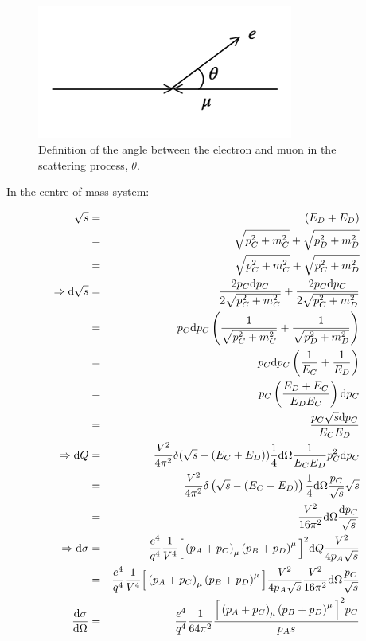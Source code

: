 \begin{figure}[!htb]
  \begin{center}
    \includegraphics[width=0.75\textwidth]{images/web_feynman/image_21.png}
    \caption[Angle between $e$ and $\mu$ in $e-\mu$ scattering]{Definition of the angle between the electron and muon in the scattering process, $\theta$.}
    \label{fig:ch7_EMuToEMuScatterAngle}
  \end{center}
\end{figure}

In the centre of mass system:

\begin{eqnarray*}
  \sqrt{s} & = & \left(E_D + E_D\right) \\
  & = & \sqrt{p_C^2 + m_C^2} + \sqrt{p_D^2 + m_D^2} \\
  & = & \sqrt{p_C^2 + m_C^2} + \sqrt{p_C^2 + m_D^2} \\
  \Rightarrow \mathrm{d}\sqrt{s} & = & \frac{2p_C\mathrm{d}p_C}{2\sqrt{p_C^2 + m_C^2}} + \frac{2p_C\mathrm{d}p_C}{2\sqrt{p_C^2 + m_D^2}} \\
  & = & p_C \mathrm{d}p_C\left(\frac{1}{\sqrt{p_C^2 + m_C^2}} + \frac{1}{\sqrt{p_D^2 + m_D^2}}\right) \\
  & = & p_C\mathrm{d}p_C\left(\frac{1}{E_C} + \frac{1}{E_D}\right) \\
  & = & p_C\left(\frac{E_D + E_C}{E_DE_C}\right)\mathrm{d}p_C \\
  & = & \frac{p_C\sqrt{s}\mathrm{d}p_C}{E_CE_D} \\
  \Rightarrow \mathrm{d}Q & = & \frac{V^2}{4\pi^2}\delta(\sqrt{s}-\left(E_C + E_D\right))\frac{1}{4}\mathrm{d}\Omega\frac{1}{E_CE_D}p_C^2\mathrm{d}p_C \\
  & = & \frac{V^2}{4\pi^2}\delta\left(\sqrt{s}-\left(E_C+E_D\right)\right)\frac{1}{4}\mathrm{d}\Omega\frac{p_C}{\sqrt{s}}\sqrt{s} \\
  & = & \frac{V^2}{16\pi^2}\mathrm{d}\Omega\frac{\mathrm{d}p_C}{\sqrt{s}} \\
  \Rightarrow \mathrm{d}\sigma & = & \frac{e^4}{q^4}\frac{1}{V^4}\Big[\left(p_A + p_C\right)_{\mu}\left(p_B + p_D\right)^{\mu}\Big]^2\mathrm{d}Q\frac{V^2}{4p_A\sqrt{s}} \\
  & = & \frac{e^4}{q^4}\frac{1}{V^4}\Big[\left(p_A + p_C\right)_{\mu}\left(p_B + p_D\right)^{\mu}\Big]\frac{V^2}{4p_A\sqrt{s}}\frac{V^2}{16\pi^2}\mathrm{d}\Omega\frac{p_C}{\sqrt{s}} \\
  \frac{\mathrm{d}\sigma}{\mathrm{d}\Omega} & = & \frac{e^4}{q^4}\frac{1}{64\pi^2}\frac{\Big[\left(p_A+p_C\right)_{\mu}\left(p_B+p_D\right)^{\mu}\Big]^2p_C}{p_As}
\end{eqnarray*}

